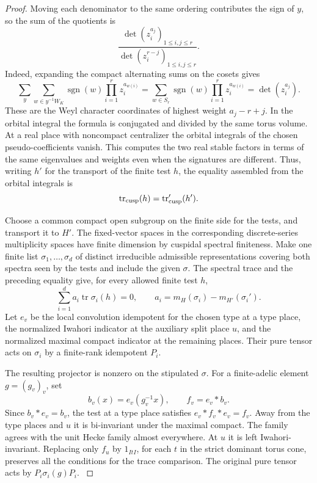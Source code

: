 \begin{proof}
Moving each denominator to the
same ordering contributes the sign of \(y\), so the sum of the
quotients is
\[
   \frac{\det(z_i^{a_j})_{1\leq i,j\leq r}}
        {\det(z_i^{r-j})_{1\leq i,j\leq r}}.
\]
Indeed, expanding the compact alternating sums on the cosets gives
\[
 \sum_y\sum_{w\in y^{-1}W_K}\operatorname{sgn}(w)
         \prod_{i=1}^r z_i^{a_{w(i)}}
 =\sum_{w\in S_r}\operatorname{sgn}(w)\prod_{i=1}^r z_i^{a_{w(i)}}
 =\det(z_i^{a_j}).
\] These are the Weyl character
coordinates of highest weight \(a_j-r+j\). In the orbital
integral the formula is conjugated and divided by the same
torus volume. At a real place with noncompact centralizer
the orbital integrals of the chosen pseudo-coefficients
vanish. This computes the two real stable factors in terms
of the same eigenvalues and weights even when the signatures
are different. Thus, writing \(h'\) for the transport of the finite test \(h\), the equality assembled from the orbital integrals is
\[
 \operatorname{tr}_{\rm cusp}(h)=\operatorname{tr}'_{\rm cusp}(h').
\] \label{cor:automorphic-realization-7}

Choose a common compact open subgroup on the finite side
for the tests, and transport it to \(H'\). The fixed-vector
spaces in the corresponding discrete-series multiplicity
spaces have finite dimension by cuspidal spectral finiteness.
Make one finite list \(\sigma_1,\ldots,\sigma_d\) of distinct
irreducible admissible representations covering both spectra
seen by the tests and include the given \(\sigma\). The
spectral trace and the preceding equality give, for every
allowed finite test \(h\),
\[
   \sum_{i=1}^d a_i\operatorname{tr}\sigma_i(h)=0,
   \qquad a_i=m_H(\sigma_i)-m_{H'}(\sigma_i').
\]
Let \(e_v\) be the local convolution idempotent for the chosen
type at a type place, the normalized Iwahori indicator at
the auxiliary split place \(u\), and the normalized maximal
compact indicator at the remaining places. Their pure tensor
acts on \(\sigma_i\) by a finite-rank idempotent \(P_i\).

The resulting projector is nonzero on the stipulated \(\sigma\). For a finite-adelic
element \(g=(g_v)_v\), set
\[
 b_v(x)=e_v(g_v^{-1}x),\qquad f_v=e_v*b_v.
\]
Since \(b_v*e_v=b_v\), the test at a type place satisfies
\(e_v*f_v*e_v=f_v\). Away from the type places and \(u\)
it is bi-invariant under the maximal compact. The family
agrees with the unit Hecke family almost everywhere. At \(u\)
it is left Iwahori-invariant. Replacing only \(f_u\) by
\(1_{ItI}\), for each \(t\) in the strict dominant torus
cone, preserves all the conditions for the trace comparison.
The original pure tensor acts by \(P_i\sigma_i(g)P_i\).
\label{cor:automorphic-realization-8}


\end{proof}
